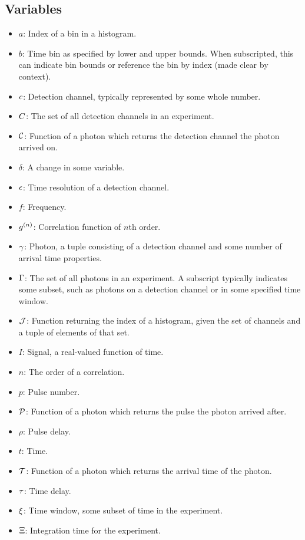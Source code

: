 \begin{appendix}
\section{Variables}
\begin{itemize}
\item $a$: Index of a bin in a histogram.
\item $b$: Time bin as specified by lower and upper bounds. When subscripted, this can indicate bin bounds or reference the bin by index (made clear by context).
\item $c$: Detection channel, typically represented by some whole number.
\item $C$: The set of all detection channels in an experiment.
\item $\mathcal{C}$: Function of a photon which returns the detection channel the photon arrived on.
\item $\delta$: A change in some variable.
\item $\epsilon$: Time resolution of a detection channel.
\item $f$: Frequency.
\item $g^{(n)}$: Correlation function of $n$th order.
\item $\gamma$: Photon, a tuple consisting of a detection channel and some number of arrival time properties.
\item $\Gamma$: The set of all photons in an experiment. A subscript typically indicates some subset, such as photons on a detection channel or in some specified time window.
\item $\mathcal{J}$: Function returning the index of a histogram, given the set of channels and a tuple of elements of that set.
\item $I$: Signal, a real-valued function of time.
\item $n$: The order of a correlation.
\item $p$: Pulse number.
\item $\mathcal{P}$: Function of a photon which returns the pulse the photon arrived after.
\item $\rho$: Pulse delay.
\item $t$: Time.
\item $\mathcal{T}$: Function of a photon which returns the arrival time of the photon.
\item $\tau$:  Time delay.
\item $\xi$: Time window, some subset of time in the experiment.
\item $\Xi$: Integration time for the experiment.
\end{itemize}


\end{appendix}
